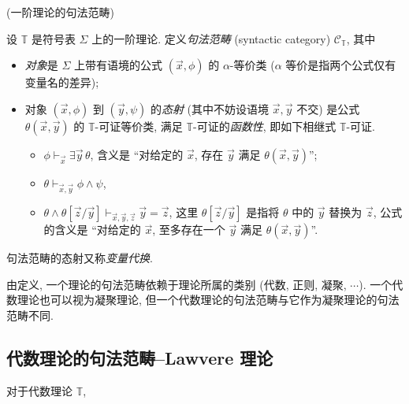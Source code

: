 \begin{definition}
	[label={first-order-theory-syntactic-category}]
	{(一阶理论的句法范畴)}
	
	设 $\mathbb T$ 是符号表 $\Sigma$ 上的一阶理论. 定义\emph{句法范畴} (syntactic category) $\mathcal C_{\mathbb T}$, 其中
	\begin{itemize}
		\item \emph{对象}是 $\Sigma$ 上带有语境的公式 $(\vec x , \phi)$ 的 $\alpha$-等价类 ($\alpha$ 等价是指两个公式仅有变量名的差异);
		\item 对象 $(\vec x , \phi)$ 到 $(\vec y , \psi)$ 的\emph{态射} (其中不妨设语境 $\vec x , \vec y$ 不交) 是公式 $\theta(\vec x,\vec y)$ 的 $\mathbb T$-可证等价类, 满足 $\mathbb T$-可证的\emph{函数性}, 即如下相继式 $\mathbb T$-可证.
		\begin{itemize}
			\item $\phi\vdash_{\vec x} \exists \vec y \,\theta$, 含义是 ``对给定的 $\vec x$, 存在 $\vec y$ 满足 $\theta(\vec x,\vec y)$'';
			\item $\theta\vdash_{\vec x,\vec y} \phi \wedge \psi$,
			\item $\theta \wedge \theta[\vec z/\vec y] \vdash_{\vec x,\vec y,\vec z} \vec y = \vec z$, 这里 $\theta[\vec z / \vec y]$ 是指将 $\theta$ 中的 $\vec y$ 替换为 $\vec z$, 公式的含义是 ``对给定的 $\vec x$, 至多存在一个 $\vec y$ 满足 $\theta(\vec x,\vec y)$''.
		\end{itemize}
	\end{itemize}
\end{definition}

\begin{remark}
	{}
	句法范畴的态射又称\emph{变量代换}.
\end{remark}

\begin{remark}
	{}
	由定义, 一个理论的句法范畴依赖于理论所属的类别 (代数, 正则, 凝聚, $\cdots$). 一个代数理论也可以视为凝聚理论, 但一个代数理论的句法范畴与它作为凝聚理论的句法范畴不同.
\end{remark}

\subsection{代数理论的句法范畴--Lawvere 理论}


\begin{prop}
	{}
	对于代数理论 $\mathbb T$,
\end{prop}

